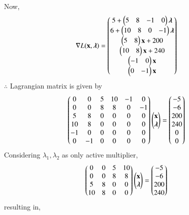 \documentclass[journal,12pt,twocolumn]{IEEEtran}
\begin{document}
Now,
\begin{align}
    \nabla L(\mathbf{x},\boldsymbol{\lambda}) &= \begin{pmatrix}5+ \begin{pmatrix}5 & 8 & -1 & 0 \end{pmatrix}\boldsymbol{\lambda}\\ 6+\begin{pmatrix}10 & 8 & 0 & -1\end{pmatrix}\boldsymbol{\lambda} \\ \begin{pmatrix}5 & 8\end{pmatrix}\mathbf{x}+200 \\ \begin{pmatrix}10 & 8\end{pmatrix}\mathbf{x}+240 \\ \begin{pmatrix}-1 & 0\end{pmatrix}\mathbf{x} \\ \begin{pmatrix}0 & -1\end{pmatrix}\mathbf{x}\end{pmatrix}
\end{align}
$\therefore$ Lagrangian matrix is given by
\begin{align}
    \begin{pmatrix}0 & 0 & 5 & 10 & -1 & 0 \\ 0 & 0 & 8 & 8 & 0 & -1 \\ 5 & 8 & 0 & 0 & 0 & 0  \\ 10 & 8 & 0 & 0 & 0 & 0  \\ -1 & 0 & 0 & 0 & 0 & 0  \\ 0 & -1 & 0 & 0 & 0 & 0 \end{pmatrix}\begin{pmatrix}\mathbf{x} \\ \boldsymbol{\lambda} \end{pmatrix} &= \begin{pmatrix}-5 \\ -6 \\ 200 \\ 240 \\ 0 \\0 \end{pmatrix}
\end{align}
Considering $\lambda_1,\lambda_2$ as only active multiplier,
\begin{align}
    \begin{pmatrix}0 & 0 & 5 & 10 \\ 0 & 0 & 8 & 8 \\ 5 & 8 & 0 & 0 \\ 10 & 8 & 0 & 0\end{pmatrix}\begin{pmatrix}\mathbf{x}\\ \boldsymbol{\lambda}\end{pmatrix} &=\begin{pmatrix}-5 \\ -6 \\ 200 \\ 240\end{pmatrix}
\end{align}
resulting in,
\end{document}

